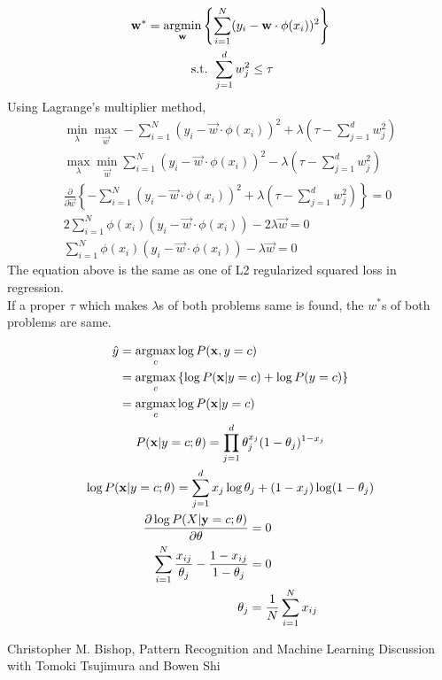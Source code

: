 \documentclass{introtosml}
\newcommand{\x}{\vec{x}}
\newcommand{\w}{\vec{w}}
\newcommand\Lnb{\sum_{i=1}^N (y_i - \w \cdot \phi(x_i))^2}
\newcommand\Lnbl{- \Lnb + \lambda (\tau - \sum_{j=1}^d w_j^2)}
\begin{document}
\maketitle

\begin{p}
  \item
    \begin{gather*}
      \w^* = \argmin_\w \left\{ \sum_{i=1}^N (y_i - \w \cdot \phi(x_i))^2 \right\} \\
      \st \sum_{j=1}^d w_j^2 \le \tau \\
    \end{gather*}
    Using Lagrange's multiplier method,
    \begin{gather*}
      \min_\lambda \max_\w \Lnbl \\
      \max_\lambda \min_\w \Lnb - \lambda (\tau - \sum_{j=1}^d w_j^2) \\
      \frac{\partial}{\partial \w} \left\{ \Lnbl \right\} = 0 \\
      2 \sum_{i=1}^N \phi(x_i) (y_i - \w \cdot \phi(x_i)) - 2 \lambda \w = 0 \\
      \sum_{i=1}^N \phi(x_i) (y_i - \w \cdot \phi(x_i)) - \lambda \w = 0
    \end{gather*}
    The equation above is the same as one of L2 regularized squared
    loss in regression. \\
    \therefore If a proper $\tau$ which makes $\lambda$s of both problems same
    is found, the $w^*$s of both problems are same.

  \item
    \begin{gather*}
      \begin{aligned}
        \hat{y}
        & = \argmax_c \log P(\x, y = c) \\
        & = \argmax_c \left\{ \log P(\x | y = c) + \log P(y = c) \right\} \\
        & = \argmax_c \log P(\x | y = c)
      \end{aligned} \\
      P(\x | y = c; \theta) = \prod_{j=1}^d \theta_j^{x_j} (1 - \theta_j)^{1 - x_j} \\
      \log P(\x | y = c; \theta) = \sum_{j = 1}^d x_j \log \theta_j + (1 - x_j) \log (1 - \theta_j) \\
      \begin{aligned}
        \frac{\partial \log P(X | \vec{y} = c; \theta)}{\partial \theta} & = 0 \\
        \sum_{i=1}^N \frac{x_{ij}}{\theta_j} - \frac{1 - x_{ij}}{1 - \theta_j} & = 0 \\
        \theta_j & = \frac{1}{N} \sum_{i=1}^N x_{ij}
      \end{aligned}
    \end{gather*}
\end{p}

\begin{thebibliography}{9}
   Christopher M. Bishop, Pattern Recognition and Machine Learning
   Discussion with Tomoki Tsujimura and Bowen Shi
\end{thebibliography}
\end{document}
